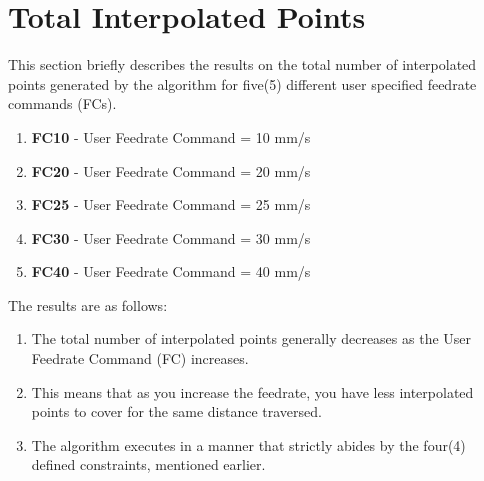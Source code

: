 \section{Total Interpolated Points}

This section briefly describes the results on the total number of interpolated points generated by the algorithm for five(5) different user specified feedrate commands (FCs).

\begin{enumerate}
	\item \textbf{FC10} - User Feedrate Command = 10 mm/s
	\item \textbf{FC20} - User Feedrate Command = 20 mm/s
	\item \textbf{FC25} - User Feedrate Command = 25 mm/s
	\item \textbf{FC30} - User Feedrate Command = 30 mm/s
	\item \textbf{FC40} - User Feedrate Command = 40 mm/s
\end{enumerate}

The results are as follows:
\begin{enumerate}
	\item The total number of interpolated points generally decreases as the User Feedrate Command (FC) increases. 
	\item This means that as you increase the feedrate, you have less interpolated points to cover for the same distance traversed.
	\item The algorithm executes in a manner that strictly abides by the four(4) defined constraints, mentioned earlier.
\end{enumerate}
	